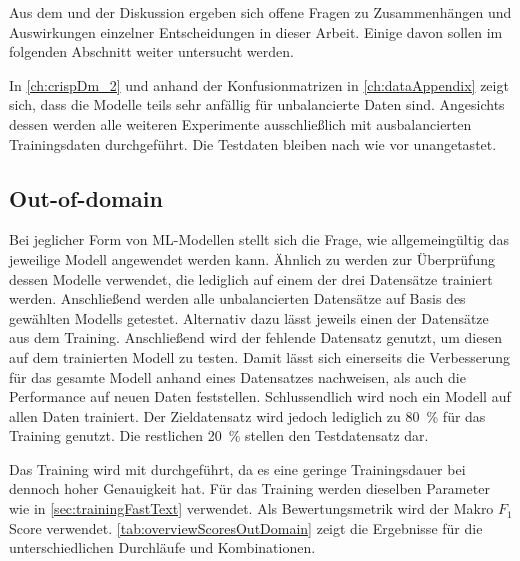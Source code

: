 Aus dem  und der Diskussion ergeben sich offene Fragen zu Zusammenhängen und Auswirkungen einzelner Entscheidungen in dieser Arbeit. Einige davon sollen im folgenden Abschnitt weiter untersucht werden.

In \autoref{ch:crispDm_2} und anhand der Konfusionmatrizen in \autoref{ch:dataAppendix} zeigt sich, dass die Modelle teils sehr anfällig für unbalancierte Daten sind. Angesichts dessen werden alle weiteren Experimente ausschließlich mit ausbalancierten Trainingsdaten durchgeführt. Die Testdaten bleiben nach wie vor unangetastet.

\subsection{Out-of-domain} \label{subsec:outOfDomain}

Bei jeglicher Form von \ac{ML}-Modellen stellt sich die Frage, wie allgemeingültig das jeweilige Modell angewendet werden kann. Ähnlich zu \textcite{biessmann_predicting_2016} werden zur Überprüfung dessen Modelle verwendet, die lediglich auf einem der drei Datensätze trainiert werden. Anschließend werden alle unbalancierten Datensätze auf Basis des gewählten Modells getestet. Alternativ dazu lässt \textcite[1631]{guhr_training_2020} jeweils einen der Datensätze aus dem Training. Anschließend wird der fehlende Datensatz genutzt, um diesen auf dem trainierten Modell zu testen. Damit lässt sich einerseits die Verbesserung für das gesamte Modell anhand eines Datensatzes nachweisen, als auch die Performance auf neuen Daten feststellen. Schlussendlich wird noch ein Modell auf allen Daten trainiert. Der Zieldatensatz wird jedoch lediglich zu \SI{80}{\percent} für das Training genutzt. Die restlichen \SI{20}{\percent} stellen den Testdatensatz dar.

Das Training wird mit \ft durchgeführt, da es eine geringe Trainingsdauer bei dennoch hoher Genauigkeit hat. Für das Training werden dieselben Parameter wie in \autoref{sec:trainingFastText} verwendet. Als Bewertungsmetrik wird der Makro \(F_{1}\) Score verwendet. \autoref{tab:overviewScoresOutDomain} zeigt die Ergebnisse für die unterschiedlichen Durchläufe und Kombinationen.

